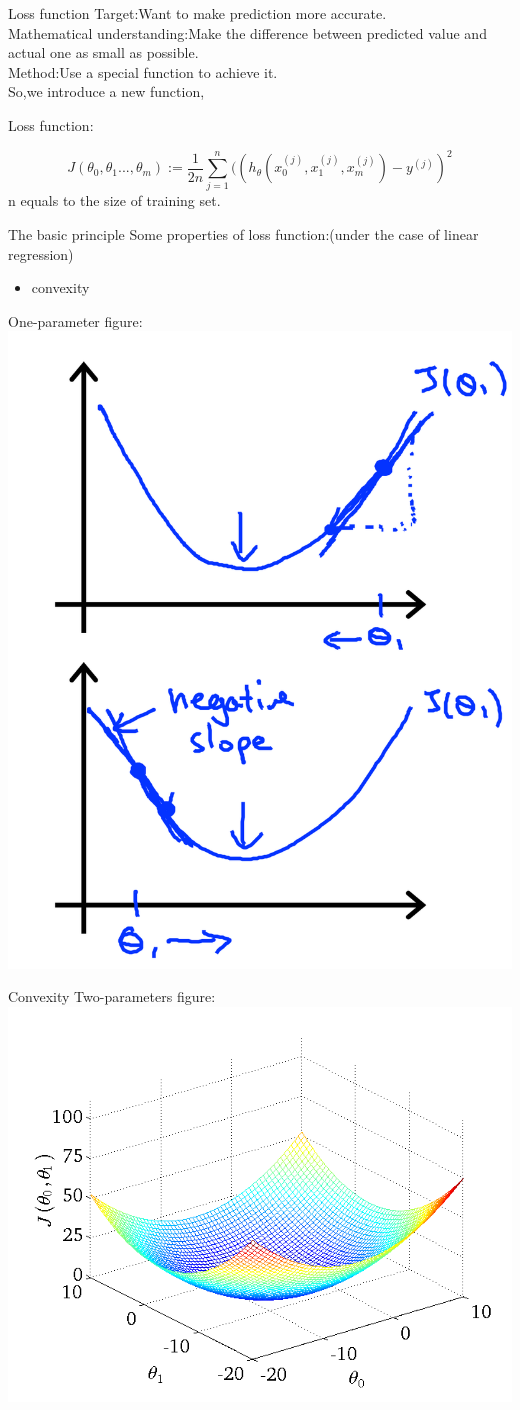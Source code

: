 \documentclass{beamer}
\begin{document}
\begin{frame}{Loss function}
Target:Want to make prediction more accurate.\\
Mathematical understanding:Make the difference between predicted value and actual one as small as possible.\\
Method:Use a special function to achieve it.\\
So,we introduce a new function,
\begin{theorem}
Loss function:


        $$J(\theta_0,\theta_1...,\theta_m):=\frac{1}{2n}\sum_{j=1}^{n}((h_{\theta}(x_0^{(j)},x_1^{(j)},x_m^{(j)})-y^{(j)})^{2}$$
 n equals to the size of training set.
\end{theorem}
\end{frame}
\begin{frame}{The basic principle}
Some properties of loss function:(under the case of linear regression)\\
\begin{itemize}
    \item convexity
\end{itemize}
One-parameter figure:\\
\includegraphics[width=.5\columnwidth]{img/graph1.PNG}
\end{frame}
\begin{frame}{Convexity}
Two-parameters figure:
\includegraphics[width=.7\columnwidth]{img/graph2.PNG}
\end{frame}
\end{document}
